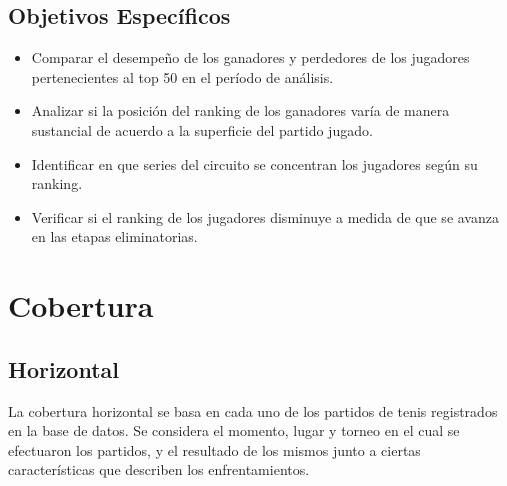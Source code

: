 \documentclass[oneside,11pt]{Latex/Classes/PhDthesisPSnPDF}
\begin{document}
\subsection{Objetivos Específicos}
\begin{itemize}
  \item{Comparar el desempeño de los ganadores y perdedores de los jugadores pertenecientes al top 50 en el período de análisis.}
  \item{Analizar si la posición del ranking de los ganadores varía de manera sustancial de acuerdo a la superficie del partido jugado.}
  \item{Identificar en que series del circuito se concentran los jugadores según su ranking.}
  \item{Verificar si el ranking de los jugadores disminuye a medida de que se avanza en las etapas eliminatorias.}
\end{itemize}

\section{Cobertura}

\subsection{Horizontal}

La cobertura horizontal se basa en cada uno de los partidos de tenis
registrados en la base de datos. Se considera el momento, lugar y torneo
en el cual se efectuaron los partidos, y el resultado de los mismos
junto a ciertas características que describen los enfrentamientos.\\
\end{document}
